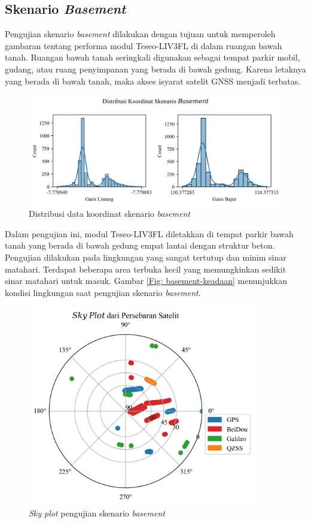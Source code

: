\subsection{Skenario \textit{Basement}}
Pengujian skenario \textit{basement} dilakukan dengan tujuan untuk memperoleh gambaran tentang performa modul Teseo\hyp{}LIV3FL di dalam ruangan bawah tanah. Ruangan bawah tanah seringkali digunakan sebagai tempat parkir mobil, gudang, atau ruang penyimpanan yang berada di bawah gedung. Karena letaknya yang berada di bawah tanah, maka akses isyarat satelit GNSS menjadi terbatas.

\begin{figure}[H]
	\centering
	\begin{adjustbox}{width=\textwidth}
		\includegraphics{contents/chapter-4/1-skenario-basement/distribution.png}
	\end{adjustbox}
	\caption{Distribusi data koordinat skenario \textit{basement}}
	\label{Fig:basement-distribution}
\end{figure}

Dalam pengujian ini, modul Teseo\hyp{}LIV3FL diletakkan di tempat parkir bawah tanah yang berada di bawah gedung empat lantai dengan struktur beton. Pengujian dilakukan pada lingkungan yang sangat tertutup dan minim sinar matahari. Terdapat beberapa area terbuka kecil yang memungkinkan sedikit sinar matahari untuk masuk. Gambar \ref{Fig: basement-keadaan} menunjukkan kondisi lingkungan saat pengujian skenario \textit{basement}.

\begin{figure}[H]
	\centering
	\includegraphics[width=10cm]{contents/chapter-4/1-skenario-basement/sky_plot.png}
	\caption{\textit{Sky plot} pengujian skenario \textit{basement}}
	\label{Fig: basement-skyplot}
\end{figure}

